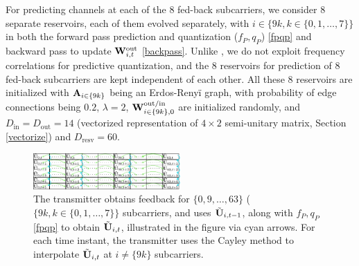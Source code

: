 \documentclass[conference]{IEEEtran}
\begin{document}
For predicting channels at each of the $8$ fed-back subcarriers, we consider $8$ separate reservoirs, each of them evolved separately, with $i\in\{9k, k \in \{0,1,\ldots,7\}\}$ in both the forward pass prediction and quantization ($f_P,q_P$) \eqref{fpqp} and backward pass to update ${\bf W}_{i,t}^{\text{out}}$ \eqref{backpass}. Unlike \cite{Gupt1905:Predictive}, we do not exploit frequency correlations for predictive quantization, and the $8$ reservoirs for prediction of $8$ fed-back subcarriers are kept independent of each other.
All these 8 reservoirs are initialized with ${\bf A}_{i\in\{9k\}}$ being an Erdos-Reny\"i graph, with probability of edge connections being $0.2$, $\lambda=2$, ${\bf W}^{\text{out/in}}_{i\in\{9k\},0}$ are initialized randomly, and $D_{\text{in}}=D_{\text{out}}=14$ (vectorized representation of $4\times2$ semi-unitary matrix, Section \ref{vectorize}) and $D_{\text{resv}}=60$.
\begin{figure}
\centering
\includegraphics[width=0.5\textwidth]{images/table.pdf}
\caption{The transmitter obtains feedback for $\{0,9,\ldots,63\}$ ($\{9k, k \in \{0,1,\ldots,7\}\}$ subcarriers, and uses $\tilde{{\bf U}}_{i,t-1}$, along with $f_P,q_P$ \eqref{fpqp} to obtain $\tilde{{\bf U}}_{i,t}$, illustrated in the figure via cyan arrows. For each time instant, the transmitter uses the Cayley method to interpolate $\tilde{{\bf U}}_{i,t}$ at $i\neq\{9k\}$ subcarriers.}
\label{table}
\vspace{5pt}
\end{figure}
\end{document}
